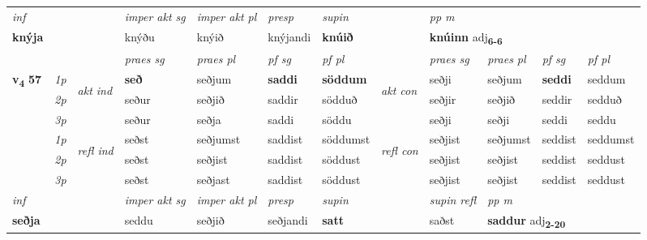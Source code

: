 \begin{longtable}[l]{X>{\footnotesize\itshape}llXXXXlXXXX}
   {\textit{inf}} & &  & \textit{imper akt sg} & \textit{imper akt pl}   & \textit{presp} & \textit{supin}  && \textit{pp m} \\*
  {\textbf{knýja}} & && knýðu  & knýið   & knýjandi &  \textbf{knúið}  && \multicolumn{2}{l}{\textbf{knúinn} adj\textbf{\textsubscript{6-6}}} \\*

\midrule

 & &   & \textit{praes sg}  & \textit{praes pl}    & \textit{ pf sg} & \textit{pf pl} & & \textit{praes sg}  & \textit{praes pl}    & \textit{pf sg} & \textit{pf pl }  \\ \cmidrule{4-7} \cmidrule{9-12}
 \multirow{2}{*}{{{\textbf{v{\textsubscript{4}}} \Large{\textbf{57}}}}}  & 1p & \multirow{3}{*}{\begin{turn}{90}\textit{akt ind}\end{turn}} & \textbf{seð} & seðjum & \textbf{saddi} & \textbf{söddum} & \multirow{3}{*}{\begin{turn}{90}\textit{akt con}\end{turn}} &seðji & seðjum & \textbf{seddi} & seddum\\*
 & 2p &  &  seður  & seðjið & saddir & södduð & & seðjir & seðjið & seddir & sedduð \\*
 & 3p &  & seður & seðja & saddi & söddu & & seðji & seðji& seddi & seddu \\*
\cmidrule{4-7} \cmidrule{9-12}
 & 1p & \multirow{3}{*}{\begin{turn}{90}\textit{refl ind}\end{turn}}  & seðst & seðjumst & saddist & söddumst & \multirow{3}{*}{\begin{turn}{90}\textit{refl con}\end{turn}}  &seðjist & seðjumst & seddist & seddumst \\*
 & 2p &  & seðst & seðjist & saddist & söddust & &seðjist & seðjist & seddist & seddust \\*
 & 3p  & & seðst & seðjast & saddist & söddust & & seðjist & seðjist& seddist & seddust \\*
\cmidrule{4-7} \cmidrule{9-12}

   {\textit{inf}} & &  & \textit{imper akt sg} & \textit{imper akt pl}   & \textit{presp} & \textit{supin} && \textit{supin refl} & \textit{pp m} \\*
  {\textbf{seðja}} & && seddu  & seðjið   & seðjandi &  \textbf{satt} && saðst & \multicolumn{2}{l}{\textbf{saddur} adj\textbf{\textsubscript{2-20}}} \\*


\end{longtable}
